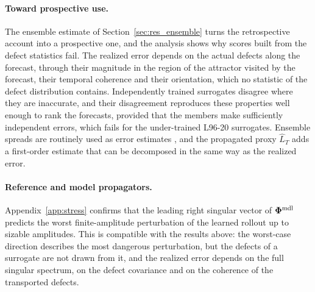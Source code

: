 \paragraph{Toward prospective use.}
The ensemble estimate of Section~\ref{sec:res_ensemble} turns the retrospective account into a prospective one, and the analysis shows why scores built from the defect statistics fail. The realized error depends on the actual defects along the forecast, through their magnitude in the region of the attractor visited by the forecast, their temporal coherence and their orientation, which no statistic of the defect distribution contains. Independently trained surrogates disagree where they are inaccurate, and their disagreement reproduces these properties well enough to rank the forecasts, provided that the members make sufficiently independent errors, which fails for the under-trained L96-20 surrogates. Ensemble spreads are routinely used as error estimates \citep{leutbecher2008,lakshminarayanan2017}, and the propagated proxy $\hat L_T$ adds a first-order estimate that can be decomposed in the same way as the realized error.

\paragraph{Reference and model propagators.}
Appendix~\ref{app:stress} confirms that the leading right singular vector of $\boldsymbol{\Phi}^{\rm mdl}$ predicts the worst finite-amplitude perturbation of the learned rollout up to sizable amplitudes. This is compatible with the results above: the worst-case direction describes the most dangerous perturbation, but the defects of a surrogate are not drawn from it, and the realized error depends on the full singular spectrum, on the defect covariance and on the coherence of the transported defects.

